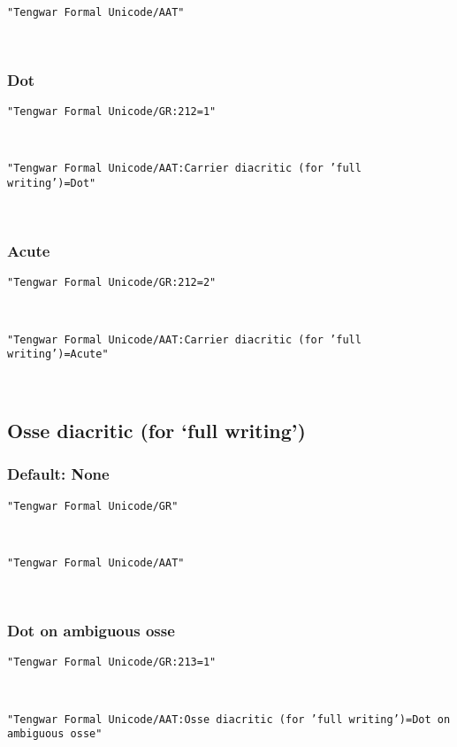 \documentclass[11pt,a4paper]{article}
\begin{document}
\formalGR  

\noindent \texttt{"Tengwar Formal Unicode/AAT"}

\formalAAT  

\subsubsection{Dot}

\texttt{"Tengwar Formal Unicode/GR:212=1"}

\formalGRcarrierdot  

\noindent \texttt{"Tengwar Formal Unicode/AAT:Carrier diacritic (for 'full writing')=Dot"}

\formalAATcarrierdot   

\subsubsection{Acute}

\texttt{"Tengwar Formal Unicode/GR:212=2"}

\formalGRcarrieracute  

\noindent \texttt{"Tengwar Formal Unicode/AAT:Carrier diacritic (for 'full writing')=Acute"}

\formalAATcarrieracute  


\subsection{Osse diacritic (for ‘full writing’)}

\subsubsection{Default: None}

\texttt{"Tengwar Formal Unicode/GR"}

\formalGR  

\noindent \texttt{"Tengwar Formal Unicode/AAT"}

\formalAAT  

\subsubsection{Dot on ambiguous osse}

\texttt{"Tengwar Formal Unicode/GR:213=1"}

\formalGRosseambiguous  

\noindent \texttt{"Tengwar Formal Unicode/AAT:Osse diacritic (for 'full writing')=Dot on ambiguous osse"}
\end{document}
